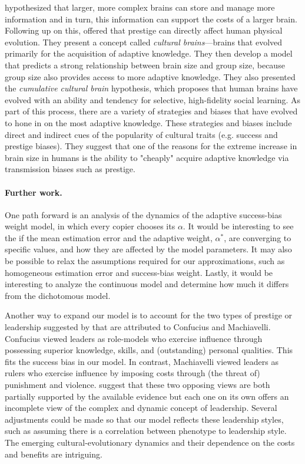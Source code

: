 \documentclass[12pt]{extarticle}
\begin{document}
\citet{social_brains} hypothesized that larger, more complex brains can store and manage more information and in turn, this information can support the costs of a larger brain.
Following up on this, \citet{collective_brains} offered that prestige can directly affect human physical evolution. They present a concept called \textit{cultural brains}---brains that evolved primarily for the acquisition of adaptive knowledge.
They then develop a model that predicts a strong relationship between brain size and group size, because group size also provides access to more adaptive knowledge. 
They also presented the \textit{cumulative cultural brain} hypothesis, which proposes that human brains have evolved with an ability and tendency for selective, high-fidelity social learning. As part of this process, there are a variety of strategies and biases that have evolved to hone in on the most adaptive knowledge. These strategies and biases include direct and indirect cues of the popularity of cultural traits (e.g. success and prestige biases).
They suggest that one of the reasons for the extreme increase in brain size in humans is the ability to "cheaply" acquire adaptive knowledge via transmission biases such as prestige.

\paragraph{Further work.}
One path forward is an analysis of the dynamics of the adaptive success-bias weight model, in which every copier chooses its $\alpha$. It would be interesting to see the if the mean estimation error and the adaptive weight, $\alpha^*$, are converging to specific values, and how they are affected by the model parameters.
It may also be possible to relax the assumptions required for our approximations, such as homogeneous estimation error and success-bias weight.
Lastly, it would be interesting to analyze the continuous model and determine how much it differs from the dichotomous model. 

Another way to expand our model is to account for the two types of prestige or leadership suggested by \citet{dual_leadership} that are attributed to Confucius and Machiavelli. Confucius viewed leaders as role-models who exercise influence through possessing superior knowledge, skills, and (outstanding) personal qualities. This fits the success bias in our model. 
In contrast, Machiavelli viewed leaders as rulers who exercise influence by imposing costs through (the threat of) punishment and violence. 
\citet{dual_leadership} suggest that these two opposing views are both partially supported by the available evidence but each one on its own offers an incomplete view of the complex and dynamic concept of leadership. 
Several adjustments could be made so that our model reflects these leadership styles, such as assuming there is a correlation between phenotype to leadership style. 
The emerging cultural-evolutionary dynamics and their dependence on the costs and benefits are intriguing.
\end{document}
